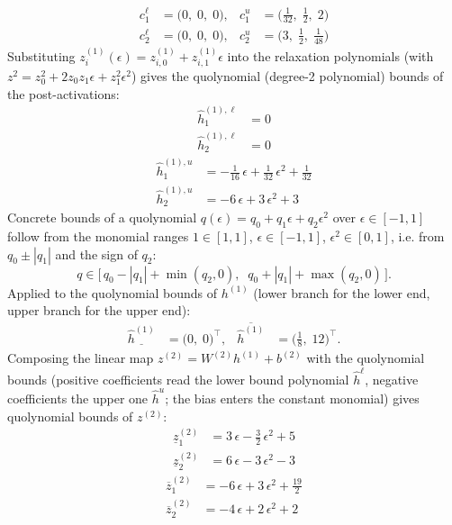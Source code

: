 \documentclass[11pt]{article}
\begin{document}
\begin{align*}
c^{\ell}_{1} &= \bigl(0,\; 0,\; 0\bigr), & c^{u}_{1} &= \bigl(\frac{1}{32},\; \frac{1}{2},\; 2\bigr) \\
c^{\ell}_{2} &= \bigl(0,\; 0,\; 0\bigr), & c^{u}_{2} &= \bigl(3,\; \frac{1}{2},\; \frac{1}{48}\bigr)
\end{align*}
Substituting $z^{(1)}_i(\epsilon) = z^{(1)}_{i,0} + z^{(1)}_{i,1} \epsilon$ into the relaxation
polynomials (with $z^2 = z_0^2 + 2 z_0 z_1 \epsilon + z_1^2 \epsilon^2$) gives the quolynomial
(degree-2 polynomial) bounds of the post-activations:
\begin{align*}
\hat{h}^{(1),\ell}_{1} &= 0 \\
\hat{h}^{(1),\ell}_{2} &= 0
\end{align*}
\begin{align*}
\hat{h}^{(1),u}_{1} &= -\frac{1}{16}\,\epsilon + \frac{1}{32}\,\epsilon^2 + \frac{1}{32} \\
\hat{h}^{(1),u}_{2} &= -6\,\epsilon + 3\,\epsilon^2 + 3
\end{align*}
Concrete bounds of a quolynomial $q(\epsilon) = q_0 + q_1 \epsilon + q_2 \epsilon^2$ over
$\epsilon \in [-1, 1]$ follow from the monomial ranges $1 \in [1, 1]$, $\epsilon \in [-1, 1]$,
$\epsilon^2 \in [0, 1]$, i.e. from $q_0 \pm |q_1|$ and the sign of $q_2$:
\begin{equation*}
q \in \bigl[\, q_0 - |q_1| + \min(q_2, 0), \;\; q_0 + |q_1| + \max(q_2, 0) \,\bigr].
\end{equation*}
Applied to the quolynomial bounds of $h^{(1)}$ (lower branch for the lower end, upper branch for the upper end):
\begin{align*}
\underline{\hat{h}^{(1)}} &= \bigl(0,\; 0\bigr)^{\!\top}, & \overline{\hat{h}^{(1)}} &= \bigl(\frac{1}{8},\; 12\bigr)^{\!\top}.
\end{align*}
Composing the linear map $z^{(2)} = W^{(2)} h^{(1)} + b^{(2)}$ with the quolynomial bounds
(positive coefficients read the lower bound polynomial $\hat{h}^{\ell}$, negative coefficients the
upper one $\hat{h}^{u}$; the bias enters the constant monomial) gives quolynomial bounds of
$z^{(2)}$:
\begin{align*}
\underline{z}^{(2)}_{1} &= 3\,\epsilon - \frac{3}{2}\,\epsilon^2 + 5 \\
\underline{z}^{(2)}_{2} &= 6\,\epsilon - 3\,\epsilon^2 - 3
\end{align*}
\begin{align*}
\overline{z}^{(2)}_{1} &= -6\,\epsilon + 3\,\epsilon^2 + \frac{19}{2} \\
\overline{z}^{(2)}_{2} &= -4\,\epsilon + 2\,\epsilon^2 + 2
\end{align*}
\end{document}
